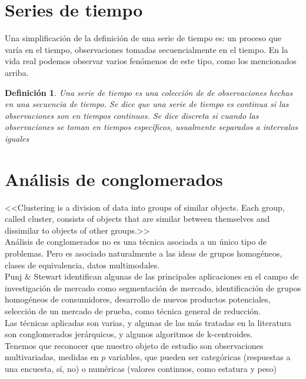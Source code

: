 \documentclass[12pt,oneside]{book}
\newtheorem*{defn}{Definici\'on}
\begin{document}
\section{Series de tiempo} %
\label{sec:series_de_tiempo}
Una simplificaci\'on de la definici\'on de una serie de tiempo es: un proceso que var\'ia en el tiempo, observaciones tomadas secuencialmente en el tiempo. En la vida real podemos observar varios fen\'omenos de este tipo, como los mencionados arriba.

\begin{defn}\normalfont
  Una serie de tiempo es una colecci\'on de de observaciones hechas en una secuencia de tiempo. Se dice que una serie de tiempo es continua si las observaciones son en tiempos continuos. Se dice discreta si cuando las observaciones se toman en tiempos espec\'ificos, usualmente separados a intervalos iguales
\end{defn}


\section{An\'alisis de conglomerados} %
\label{sec:analisis_de_conglomerados}
<<Clustering is a division of data into groups of similar objects. Each group, called cluster, consists of objects that are similar between themselves and dissimilar to objects of other groups.>>~\cite{CLUSTER_DEFINITION}\\

An\'alisis de conglomerados no es una t\'ecnica asociada a un \'unico tipo de problemas. Pero es asociado naturalmente a las ideas de grupos homog\'eneos, clases de equivalencia, datos multimodales.\\

Punj \& Stewart identifican algunas de las principales aplicaciones en el campo de investigaci\'on de mercado como segmentaci\'on de mercado, identificaci\'on de grupos homog\'eneos de consumidores, desarrollo de nuevos productos potenciales, selecci\'on de un mercado de prueba, como t\'ecnica general de reducci\'on.\\

Las t\'ecnicas aplicadas son varias, y algunas de las m\'as tratadas en la literatura son conglomerados jer\'arquicos, y algunos algoritmos de k-centroides.\\

Tenemos que reconocer que nuestro objeto de estudio son observaciones multivariadas, medidas en $p$ variables, que pueden ser categ\'oricas (respuestas a una encuesta, s\'i, no) o num\'ericas (valores continuos, como estatura y peso)
\end{document}
